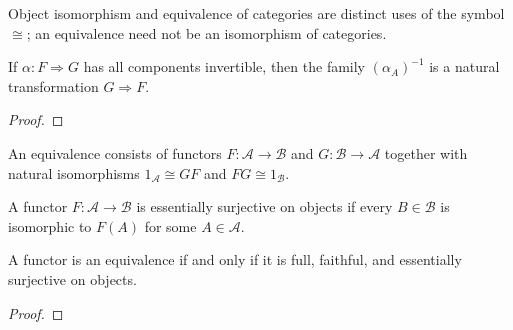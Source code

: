 \begin{warning}
\label{warn:lbc-iso-equivalence}
Object isomorphism and equivalence of categories are distinct uses of the
symbol $\cong$; an equivalence need not be an isomorphism of categories.
\end{warning}

\begin{lemma}
\label{lem:lbc-pointwise-inverse}
If $\alpha:F\Rightarrow G$ has all components invertible, then the family
$(\alpha_A)^{-1}$ is a natural transformation $G\Rightarrow F$.
\notready
\end{lemma}
\begin{proof}
\notready
\end{proof}

\begin{definition}
\label{def:lbc-equivalence}
An equivalence consists of functors $F:\mathcal A\to\mathcal B$ and
$G:\mathcal B\to\mathcal A$ together with natural isomorphisms
$1_{\mathcal A}\cong GF$ and $FG\cong1_{\mathcal B}$.
\end{definition}

\begin{definition}
\label{def:lbc-essentially-surjective}
A functor $F:\mathcal A\to\mathcal B$ is essentially surjective on objects if
every $B\in\mathcal B$ is isomorphic to $F(A)$ for some $A\in\mathcal A$.
\end{definition}

\begin{proposition}
\label{prop:lbc-equivalence-criterion}
A functor is an equivalence if and only if it is full, faithful, and essentially
surjective on objects.
\notready
\end{proposition}
\begin{proof}
\notready
\end{proof}

